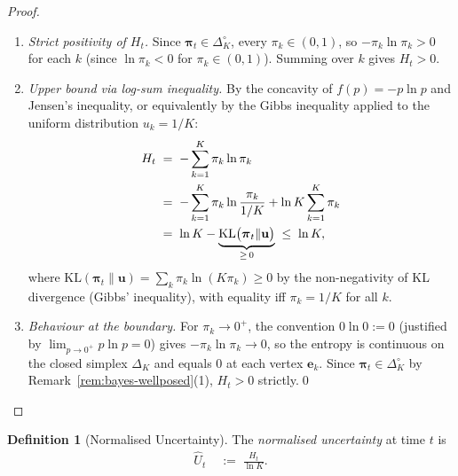 \documentclass[12pt,openany]{book}
\newcommand{\bfu}{\mathbf{u}}
\newcommand{\bfpi}{\boldsymbol{\pi}}
\numberwithin{equation}{chapter}
\theoremstyle{plain}
\theoremstyle{definition}
\newtheorem{definition}[theorem]{Definition}
\theoremstyle{remark}
\numberwithin{equation}{chapter}
\theoremstyle{plain}
\newcommand{\bfe}{\mathbf{e}}
\begin{document}
\begin{proof}
\begin{enumerate}
  \item \emph{Strict positivity of $H_t$.}
        Since $\bfpi_t \in \Delta_K^{\circ}$, every
        $\pi_k \in (0,1)$, so $-\pi_k \ln\pi_k > 0$
        for each $k$ (since $\ln\pi_k < 0$ for
        $\pi_k \in (0,1)$).  Summing over $k$ gives
        $H_t > 0$.

  \item \emph{Upper bound via log-sum inequality.}
        By the concavity of $f(p) = -p\ln p$ and
        Jensen's inequality, or equivalently by the
        Gibbs inequality applied to the uniform
        distribution $u_k = 1/K$:
        \begin{align}
          H_t
          &\;=\;
          -\sum_{k=1}^{K} \pi_k \ln \pi_k
          \notag\\
          &\;=\;
          -\sum_{k=1}^{K} \pi_k \ln\frac{\pi_k}{1/K}
           + \ln K \sum_{k=1}^{K}\pi_k
          \notag\\
          &\;=\;
          \ln K
          - \underbrace{
              \mathrm{KL}\bigl(\bfpi_t \| \bfu\bigr)
            }_{\geq\,0}
          \;\leq\; \ln K,
          \label{eq:entropy-ub}
        \end{align}
        where $\mathrm{KL}(\bfpi_t \| \bfu)
        = \sum_k \pi_k \ln(K\pi_k) \geq 0$
        by the non-negativity of KL divergence
        (Gibbs' inequality), with equality iff
        $\pi_k = 1/K$ for all $k$.

  \item \emph{Behaviour at the boundary.}
        For $\pi_k \to 0^+$, the convention
        $0\ln 0 := 0$ (justified by
        $\lim_{p \to 0^+} p \ln p = 0$) gives
        $-\pi_k \ln\pi_k \to 0$, so the entropy
        is continuous on the closed simplex $\Delta_K$
        and equals $0$ at each vertex $\bfe_k$.
        Since $\bfpi_t \in \Delta_K^{\circ}$ by
        Remark~\ref{rem:bayes-wellposed}(1), $H_t > 0$
        strictly.\qed
\end{enumerate}
\end{proof}

\begin{definition}[Normalised Uncertainty]
\label{def:norm-uncertainty}
The \emph{normalised uncertainty} at time $t$ is
\begin{align}
  \hat{U}_t
  &\;:=\;
  \frac{H_t}{\ln K}.
  \label{eq:norm-uncertainty}
\end{align}
\end{definition}
\end{document}
